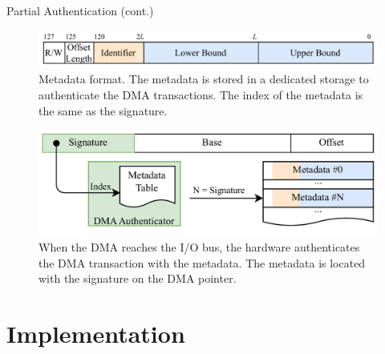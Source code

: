 \documentclass[10pt,aspectratio=169,mathserif]{beamer}
\newcommand{\name}{{\texorpdfstring{D{\smaller MA}A{\smaller UTH}}\xspace}\xspace}
\begin{document}
\begin{frame}{Partial Authentication (cont.)}
	\begin{figure}
		\centering
		\includegraphics[width=0.6\linewidth]{./images/metadata.png}
		\caption{Metadata format. The metadata is stored in a dedicated storage to authenticate the DMA transactions. The index of the metadata is the same as the signature.}
	\end{figure}
	\vspace{-20pt}
	\begin{figure}
		\centering
		\includegraphics[width=0.6\linewidth]{./images/signing.png}
		\caption{When the DMA reaches the I/O bus, the hardware authenticates the DMA transaction with the metadata. The metadata is located with the signature on the DMA pointer.}
	\end{figure}
\end{frame}

\section{Implementation}
\end{document}
